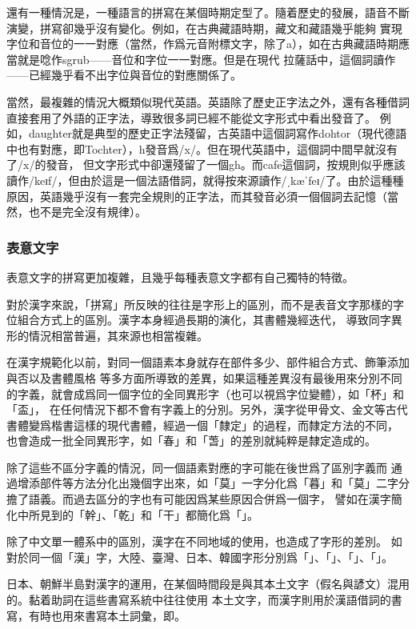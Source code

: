 還有一種情況是，一種語言的拼寫在某個時期定型了。隨着歷史的發展，語音不斷演變，拼寫卻幾乎沒有變化。例如，在古典藏語時期，藏文和藏語幾乎能夠
實現字位和音位的一一對應（當然，作爲元音附標文字，除了a），如在古典藏語時期應當就是唸作sgrub——音位和字位一一對應。但是在現代
拉薩話中，這個詞讀作——已經幾乎看不出字位與音位的對應關係了。

當然，最複雜的情況大概類似現代英語。英語除了歷史正字法之外，還有各種借詞直接套用了外語的正字法，導致很多詞已經不能從文字形式中看出發音了。
例如，daughter就是典型的歷史正字法殘留，古英語中這個詞寫作dohtor（現代德語中也有對應，即Tochter），h發音爲/x/。但在現代英語中，這個詞中間早就沒有了/x/的發音，
但文字形式中卻還殘留了一個gh。而cafe這個詞，按規則似乎應該讀作/keɪf/，但由於這是一個法語借詞，就得按來源讀作/ˌkæˈfeɪ/了。由於這種種
原因，英語幾乎沒有一套完全規則的正字法，而其發音必須一個個詞去記憶（當然，也不是完全沒有規律）。

\subsubsection*{表意文字}

表意文字的拼寫更加複雜，且幾乎每種表意文字都有自己獨特的特徵。

對於漢字來說，「拼寫」所反映的往往是字形上的區別，而不是表音文字那樣的字位組合方式上的區別。漢字本身經過長期的演化，其書體幾經迭代，
導致同字異形的情況相當普遍，其來源也相當複雜。

在漢字規範化以前，對同一個語素本身就存在部件多少、部件組合方式、飾筆添加與否以及書體風格
等多方面所導致的差異，如果這種差異沒有最後用來分別不同的字義，就會成爲同一個字位的全同異形字（也可以視爲字位變體），如「杯」和「盃」，
在任何情況下都不會有字義上的分別。另外，漢字從甲骨文、金文等古代書體變爲楷書這樣的現代書體，經過一個「隸定」的過程，而隸定方法的不同，
也會造成一批全同異形字，如「春」和「萅」的差別就純粹是隸定造成的。

除了這些不區分字義的情況，同一個語素對應的字可能在後世爲了區別字義而
通過增添部件等方法分化出幾個字出來，如「莫」一字分化爲「暮」和「莫」二字分擔了語義。而過去區分的字也有可能因爲某些原因合併爲一個字，
譬如在漢字簡化中所見到的「幹」、「乾」和「干」都簡化爲「」。

除了中文單一體系中的區別，漢字在不同地域的使用，也造成了字形的差別。
如對於同一個「漢」字，大陸、臺灣、日本、韓國字形分別爲「」、「」、「」、「」。

日本、朝鮮半島對漢字的運用，在某個時間段是與其本土文字（假名與諺文）混用的。黏着助詞在這些書寫系統中往往使用
本土文字，而漢字則用於漢語借詞的書寫，有時也用來書寫本土詞彙，即。

